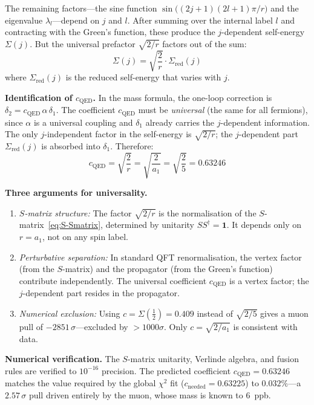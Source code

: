 \documentclass[12pt,a4paper]{article}
\theoremstyle{definition}
\begin{document}
The remaining factors---the sine function $\sin\bigl((2j+1)(2l+1)\pi/r\bigr)$ and the eigenvalue $\lambda_l$---depend on $j$ and $l$.  After summing over the internal label $l$ and contracting with the Green's function, these produce the $j$-dependent self-energy $\Sigma(j)$.  But the universal prefactor $\sqrt{2/r}$ factors out of the sum:
\begin{equation}
\Sigma(j) = \sqrt{\frac{2}{r}} \cdot \Sigma_{\text{red}}(j)
\end{equation}
where $\Sigma_{\text{red}}(j)$ is the reduced self-energy that varies with $j$.

\textbf{Identification of $c_{\text{QED}}$.}  In the mass formula, the one-loop correction is $\delta_2 = c_{\text{QED}}\,\alpha\,\delta_1$.  The coefficient $c_{\text{QED}}$ must be \emph{universal} (the same for all fermions), since $\alpha$ is a universal coupling and $\delta_1$ already carries the $j$-dependent information.  The only $j$-independent factor in the self-energy is $\sqrt{2/r}$; the $j$-dependent part $\Sigma_{\text{red}}(j)$ is absorbed into $\delta_1$.  Therefore:
\begin{equation}
\boxed{c_{\text{QED}} = \sqrt{\frac{2}{r}} = \sqrt{\frac{2}{a_1}} = \sqrt{\frac{2}{5}} = 0.63246}
\end{equation}

\textbf{Three arguments for universality.}
\begin{enumerate}
\item \emph{$S$-matrix structure:}  The factor $\sqrt{2/r}$ is the normalisation of the $S$-matrix~\eqref{eq:S-Smatrix}, determined by unitarity $SS^\dagger = \mathbf{1}$.  It depends only on $r = a_1$, not on any spin label.
\item \emph{Perturbative separation:}  In standard QFT renormalisation, the vertex factor (from the $S$-matrix) and the propagator (from the Green's function) contribute independently.  The universal coefficient $c_{\text{QED}}$ is a vertex factor; the $j$-dependent part resides in the propagator.
\item \emph{Numerical exclusion:}  Using $c = \Sigma(\tfrac{1}{2}) = 0.409$ instead of $\sqrt{2/5}$ gives a muon pull of $-2851\,\sigma$---excluded by $>1000\sigma$.  Only $c = \sqrt{2/a_1}$ is consistent with data.
\end{enumerate}

\textbf{Numerical verification.}  The $S$-matrix unitarity, Verlinde algebra, and fusion rules are verified to $10^{-16}$ precision.  The predicted coefficient $c_{\text{QED}} = 0.63246$ matches the value required by the global $\chi^2$ fit ($c_{\text{needed}} = 0.63225$) to $0.032\%$---a $2.57\,\sigma$ pull driven entirely by the muon, whose mass is known to $6$~ppb.
\end{document}
